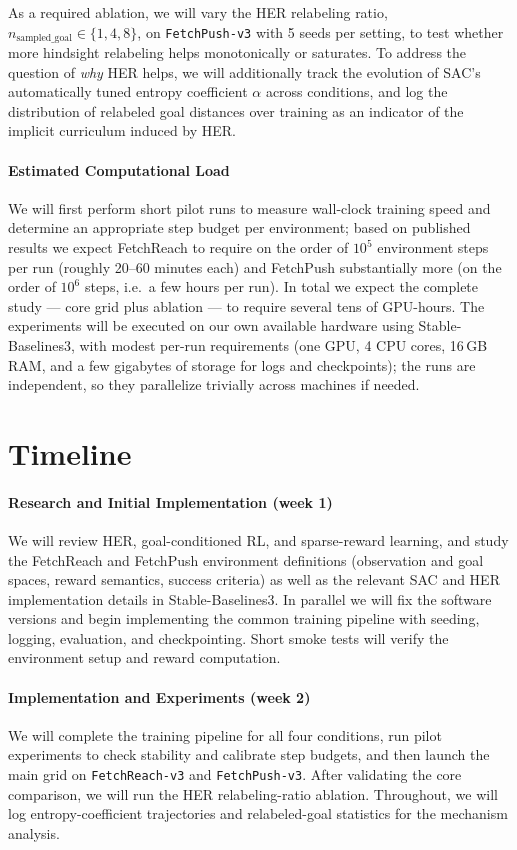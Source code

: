 \documentclass{article}
\begin{document}
As a required ablation, we will vary the HER relabeling ratio,
$n_{\text{sampled\_goal}} \in \{1, 4, 8\}$, on \texttt{FetchPush-v3} with 5
seeds per setting, to test whether more hindsight relabeling helps
monotonically or saturates. To address the question of \emph{why} HER helps,
we will additionally track the evolution of SAC's automatically tuned entropy
coefficient $\alpha$ across conditions, and log the distribution of relabeled
goal distances over training as an indicator of the implicit curriculum
induced by HER.

\paragraph{Estimated Computational Load}
We will first perform short pilot runs to measure wall-clock training speed
and determine an appropriate step budget per environment; based on published
results we expect FetchReach to require on the order of $10^5$ environment
steps per run (roughly 20--60 minutes each) and FetchPush substantially more
(on the order of $10^6$ steps, i.e.\ a few hours per run). In total we
expect the complete study --- core grid plus ablation --- to require several
tens of GPU-hours. The experiments will be executed on our own available
hardware using Stable-Baselines3, with modest per-run requirements
(one GPU, 4 CPU cores, 16\,GB RAM, and a few gigabytes of storage for logs
and checkpoints); the runs are independent, so they parallelize trivially
across machines if needed.

\section{Timeline}
\paragraph{Research and Initial Implementation (week 1)}
We will review HER, goal-conditioned RL, and sparse-reward learning, and
study the FetchReach and FetchPush environment definitions (observation and
goal spaces, reward semantics, success criteria) as well as the relevant SAC
and HER implementation details in Stable-Baselines3. In parallel we will fix
the software versions and begin implementing the common training pipeline
with seeding, logging, evaluation, and checkpointing. Short smoke tests will
verify the environment setup and reward computation.

\paragraph{Implementation and Experiments (week 2)}
We will complete the training pipeline for all four conditions, run pilot
experiments to check stability and calibrate step budgets, and then launch
the main grid on \texttt{FetchReach-v3} and \texttt{FetchPush-v3}. After
validating the core comparison, we will run the HER relabeling-ratio
ablation. Throughout, we will log entropy-coefficient trajectories and
relabeled-goal statistics for the mechanism analysis.
\end{document}

